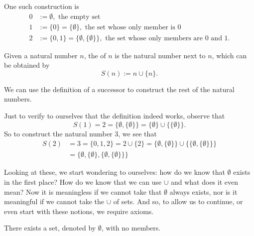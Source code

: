 \documentclass[notoc,notitlepage]{tufte-book}
\begin{document}
One such construction is
\begin{align*}
  0 &:= \emptyset, \text{ the empty set } \\
  1 &:= \{0\} = \{ \emptyset \}, \text{ the set whose only member is } 0 \\
  2 &:= \{0, 1\} = \{ \emptyset, \{ \emptyset \} \}, \text{ the set whose only members are } 0 \text{ and } 1.
\end{align*}

\begin{defn}[Successor]
\label{defn:successor}
  Given a natural number $n$, the  of $n$ is the natural number next to $n$, which can be obtained by
  \begin{equation*}
    S(n) := n \cup \{ n \}.
  \end{equation*}
\end{defn}

We can use the definition of a successor to construct the rest of the natural numbers.

\begin{eg}
  Just to verify to ourselves that the definition indeed works, observe that
  \begin{equation*}
    S(1) = 2 = \{ \emptyset, \{ \emptyset \} \} = \{ \emptyset \} \cup \{ \{ \emptyset \} \}.
  \end{equation*}
  So to construct the natural number $3$, we see that
  \begin{align*}
    S(2) &= 3 = \{ 0, 1, 2 \} = 2 \cup \{ 2 \} = \{ \emptyset, \{ \emptyset \} \} \cup \{ \{ \emptyset, \{ \emptyset \} \} \} \\
         &= \{ \emptyset, \{ \emptyset \}, \{ \emptyset, \{ \emptyset \} \} \}
  \end{align*}
\end{eg}

Looking at these, we start wondering to ourselves: how do we know that $\emptyset$ exists in the first place? How do we know that we can use $\cup$ and what does it even mean? Now it is meaningless if we cannot take that $\emptyset$ always exists, nor is it meaningful if we cannot take the $\cup$ of sets. And so, to allow us to continue, or even start with these notions, we require axioms.

\begin{axiom}
\label{axiom:empty_set_axiom}
  There exists a set, denoted by $\emptyset$, with no members.
\end{axiom}
\end{document}
